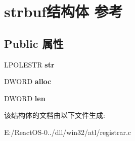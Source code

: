 \hypertarget{structstrbuf}{}\section{strbuf结构体 参考}
\label{structstrbuf}
\subsection*{Public 属性}
\begin{DoxyCompactItemize}
\item 
\mbox{\label{structstrbuf_a3332c4564543d957dd3c0708651fbac5}} 
L\+P\+O\+L\+E\+S\+TR {\bfseries str}
\item 
\mbox{\label{structstrbuf_a868690425779124dab7b19b661398c8b}} 
D\+W\+O\+RD {\bfseries alloc}
\item 
\mbox{\label{structstrbuf_a28070ad4f9545dc033c209df1f079ff4}} 
D\+W\+O\+RD {\bfseries len}
\end{DoxyCompactItemize}


该结构体的文档由以下文件生成\+:\begin{DoxyCompactItemize}
\item 
E\+:/\+React\+O\+S-\/0../dll/win32/atl/registrar.\+c\end{DoxyCompactItemize}

